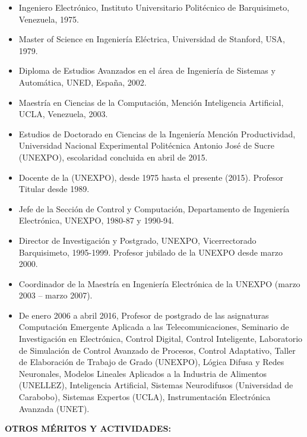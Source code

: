 \begin{footnotesize}

   	\begin{itemize}
   	\item Ingeniero Electrónico, Instituto Universitario Politécnico de Barquisimeto, Venezuela, 1975.
    \item Master of Science en Ingeniería Eléctrica, Universidad de Stanford, USA, 1979.
 	\item Diploma de Estudios Avanzados en el área de Ingeniería de Sistemas y Automática, UNED, España, 2002.
 	\item Maestría en Ciencias de la Computación, Mención Inteligencia Artificial, UCLA, Venezuela, 2003.
	\item Estudios de Doctorado en Ciencias de la Ingeniería Mención Productividad, Universidad Nacional Experimental Politécnica Antonio José de Sucre (UNEXPO), escolaridad concluida en abril de 2015.
	\item Docente de la (UNEXPO), desde 1975 hasta el presente (2015).  Profesor Titular desde 1989.
	\item Jefe de la Sección de Control y Computación, Departamento de Ingeniería Electrónica, UNEXPO, 1980-87 y 1990-94.
	\item Director de Investigación y Postgrado, UNEXPO, Vicerrectorado Barquisimeto, 1995-1999.
Profesor jubilado de la UNEXPO desde marzo 2000.
	\item Coordinador de la Maestría en Ingeniería Electrónica de la UNEXPO (marzo 2003 – marzo 2007).
	\item De enero 2006 a abril 2016, Profesor de postgrado de las asignaturas Computación Emergente Aplicada a las Telecomunicaciones, Seminario de Investigación en Electrónica, Control Digital, Control Inteligente, Laboratorio de Simulación de Control Avanzado de Procesos, Control Adaptativo, Taller de Elaboración de Trabajo de Grado (UNEXPO), Lógica Difusa y Redes Neuronales, Modelos Lineales Aplicados a la Industria de Alimentos (UNELLEZ), Inteligencia Artificial, Sistemas Neurodifusos (Universidad de Carabobo), Sistemas Expertos (UCLA), Instrumentación Electrónica Avanzada (UNET).
   	\end{itemize}     
\newpage

\textbf{OTROS MÉRITOS Y ACTIVIDADES:}
 	\begin{itemize}
 	

\end{itemize}
\end{footnotesize}
